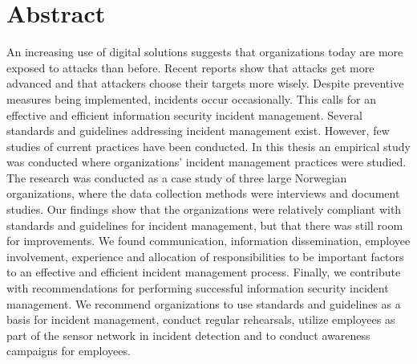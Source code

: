\chapter*{Abstract}
An increasing use of digital solutions suggests that organizations today are more exposed to attacks than before. Recent reports show that attacks get more advanced and that attackers choose their targets more wisely. Despite preventive measures being implemented, incidents occur occasionally. This calls for an effective and efficient information security incident management. Several standards and guidelines addressing incident management exist. However, few studies of current practices have been conducted. In this thesis an empirical study was conducted where organizations' incident management practices were studied. The research was conducted as a case study of three large Norwegian organizations, where the data collection methods were interviews and document studies. Our findings show that the organizations were relatively compliant with standards and guidelines for incident management, but that there was still room for improvements. We found communication, information dissemination, employee involvement, experience and allocation of responsibilities to be important factors to an effective and efficient incident management process. Finally, we contribute with recommendations for performing successful information security incident management. We recommend organizations to use standards and guidelines as a basis for incident management, conduct regular rehearsals, utilize employees as part of the sensor network in incident detection and to conduct awareness campaigns for employees.
